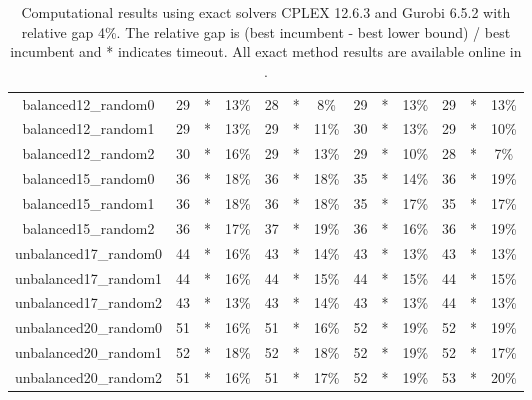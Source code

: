 \begin{table}
\begin{adjustbox}{center}
\begin{tabular}{|ccccccccccccc|}
balanced12\_random0 & 29 & * & 13\% & 28 & * & 8\% & 29 & * & 13\% & 29 & * & 13\% \\ 
balanced12\_random1 & 29 & * & 13\% & 29 & * & 11\% & 30 & * & 13\% & 29 & * & 10\% \\ 
balanced12\_random2 & 30 & * & 16\% & 29 & * & 13\% & 29 & * & 10\% & 28 & * & 7\% \\ 
balanced15\_random0 & 36 & * & 18\% & 36 & * & 18\% & 35 & * & 14\% & 36 & * & 19\% \\ 
balanced15\_random1 & 36 & * & 18\% & 36 & * & 18\% & 35 & * & 17\% & 35 & * & 17\% \\ 
balanced15\_random2 & 36 & * & 17\% & 37 & * & 19\% & 36 & * & 16\% & 36 & * & 19\% \\ 
unbalanced17\_random0 & 44 & * & 16\% & 43 & * & 14\% & 43 & * & 13\% & 43 & * & 13\% \\ 
unbalanced17\_random1 & 44 & * & 16\% & 44 & * & 15\% & 44 & * & 15\% & 44 & * & 15\% \\ 
unbalanced17\_random2 & 43 & * & 13\% & 43 & * & 14\% & 43 & * & 13\% & 44 & * & 13\% \\ 
unbalanced20\_random0 & 51 & * & 16\% & 51 & * & 16\% & 52 & * & 19\% & 52 & * & 19\% \\ 
unbalanced20\_random1 & 52 & * & 18\% & 52 & * & 18\% & 52 & * & 19\% & 52 & * & 17\% \\ 
unbalanced20\_random2 & 51 & * & 16\% & 51 & * & 17\% & 52 & * & 19\% & 53 & * & 20\% \\ 
\hline 
\end{tabular} 
\end{adjustbox} 
\vspace*{-0.2cm} 
\caption{Computational results using exact solvers CPLEX 12.6.3 and Gurobi 6.5.2 with relative gap 4\%. The relative gap is (best incumbent - best lower bound) / best incumbent and  * indicates timeout. All exact method results are available online in \cite{source_code}.} 
\label{Table:Transportation_Models} 
\end{table} 
